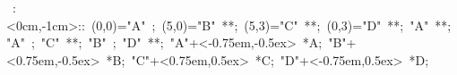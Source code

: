 

\hbox{
\xy    <1cm,0cm>:<0cm,-1cm>::
       (0,0)="A" ; (5,0)="B" **\dir{-}; 
       (5,3)="C" **\dir{-}; (0,3)="D" **\dir{-}; "A" **\dir{-};
       "A" ; "C" **\dir{-}; "B" ; "D" **\dir{-};
       "A"+<-0.75em,-0.5ex> *{A};
       "B"+<0.75em,-0.5ex> *{B};
       "C"+<0.75em,0.5ex> *{C};
       "D"+<-0.75em,0.5ex> *{D};
       \endxy}
	   
